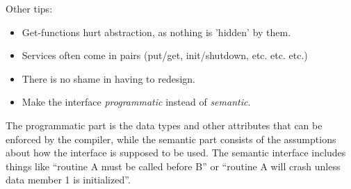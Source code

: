Other tips:
\begin{itemize}
    \item Get-functions hurt abstraction, as nothing is 'hidden' by them.
    \item Services often come in pairs (put/get, init/shutdown, etc. etc. etc.)
    \item There is no shame in having to redesign.
    \item Make the interface \emph{programmatic} instead of \emph{semantic}.
\end{itemize}
The programmatic part is the data types and other attributes that can be enforced by the compiler, while the semantic part consists of the assumptions about how the interface is supposed to be used. The semantic interface includes things like ``routine A must be called before B'' or ``routine A will crash unless data member 1 is initialized''. 

